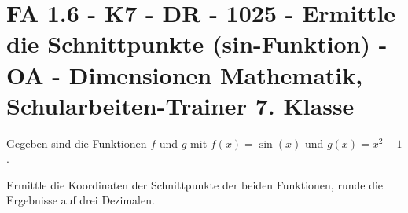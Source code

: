 \section{FA 1.6 - K7 - DR - 1025 - Ermittle die Schnittpunkte (sin-Funktion) - OA - Dimensionen Mathematik, Schularbeiten-Trainer 7. Klasse}

\begin{beispiel}[K7 - DR]{1} %
Gegeben sind die Funktionen $f$ und $g$ mit $f(x)=\sin(x)$ und $g(x)=x^2-1$.

Ermittle die Koordinaten der Schnittpunkte der beiden Funktionen, runde die Ergebnisse auf drei Dezimalen.\leer

				
				\end{beispiel}